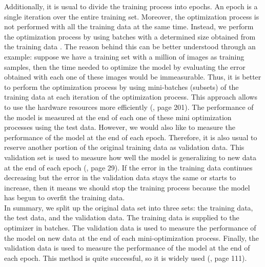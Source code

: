 Additionally, it is usual to divide the training process into epochs. An epoch is a single iteration over the entire training set. Moreover, the optimization process is not performed with all the training data at the same time. Instead, we perform the optimization process by using batches with a determined size obtained from the training data \cite{epoch_online}. The reason behind this can be better understood through an example: suppose we have a training set with a million of images as training samples, then the time needed to optimize the model by evaluating the error obtained with each one of these images would be immeasurable. Thus, it is better to perform the optimization process by using mini-batches (subsets) of the training data at each iteration of the optimization process. This approach allows to use the hardware resources more efficiently (\cite{deep_learning}, page 201). The performance of the model is measured at the end of each one of these mini optimization processes using the test data. However, we would also like to measure the performance of the model at the end of each epoch. Therefore, it is also usual to reserve another portion of the original training data as validation data. This validation set is used to measure how well the model is generalizing to new data at the end of each epoch (\cite{fudamentals_deep_learning}, page 29). If the error in the training data continues decreasing but the error in the validation data stays the same or starts to increase, then it means we should stop the training process because the model has begun to overfit the training data.\\

In summary, we split up the original data set into three sets:  the training data,  the test data, and the validation data.  The training data is supplied to the optimizer in batches. The validation data is used to measure the performance of the model on new data at the end of each mini-optimization process. Finally, the validation data is used to measure the performance of the model at the end of each epoch. This method is quite successful, so it is widely used (\cite{machine_mitchell}, page 111).\\

